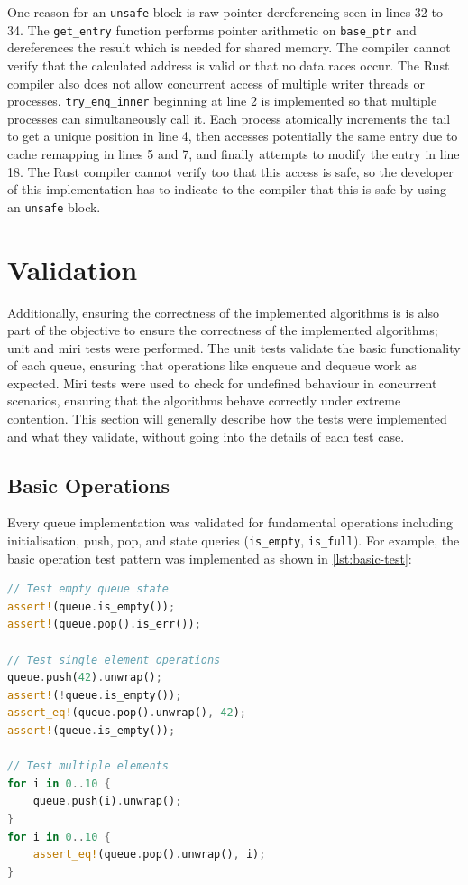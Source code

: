 One reason for an \texttt{unsafe} block is raw pointer dereferencing seen in lines 32 to 34. The \texttt{get\_entry} function performs pointer arithmetic on \texttt{base\_ptr} and dereferences the result which is needed for shared memory. The compiler cannot verify that the calculated address is valid or that no data races occur. The Rust compiler also does not allow concurrent access of multiple writer threads or processes. \texttt{try\_enq\_inner} beginning at line 2 is implemented so that multiple processes can simultaneously call it. Each process atomically increments the tail to get a unique position in line 4, then accesses potentially the same entry due to cache remapping in lines 5 and 7, and finally attempts to modify the entry in line 18. The Rust compiler cannot verify too that this access is safe, so the developer of this implementation has to indicate to the compiler that this is safe by using an \texttt{unsafe} block.

\section{Validation}
Additionally, ensuring the correctness of the implemented algorithms is is also part of the objective to ensure the correctness of the implemented algorithms; unit and miri tests were performed. The unit tests validate the basic functionality of each queue, ensuring that operations like enqueue and dequeue work as expected. Miri tests were used to check for undefined behaviour in concurrent scenarios, ensuring that the algorithms behave correctly under extreme contention. This section will generally describe how the tests were implemented and what they validate, without going into the details of each test case.

\subsection{Basic Operations}
Every queue implementation was validated for fundamental operations including initialisation, push, pop, and state queries (\texttt{is\_empty}, \texttt{is\_full}). For example, the basic operation test pattern was implemented as shown in \cref{lst:basic-test}:

\begin{lstlisting}[language=Rust, style=boxed, caption={Basic operation test pattern}, label={lst:basic-test}]
// Test empty queue state
assert!(queue.is_empty());
assert!(queue.pop().is_err());

// Test single element operations
queue.push(42).unwrap();
assert!(!queue.is_empty());
assert_eq!(queue.pop().unwrap(), 42);
assert!(queue.is_empty());

// Test multiple elements
for i in 0..10 {
    queue.push(i).unwrap();
}
for i in 0..10 {
    assert_eq!(queue.pop().unwrap(), i);
}
\end{lstlisting}

